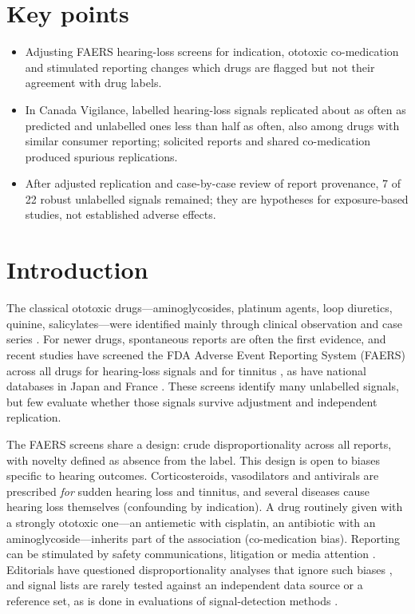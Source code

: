 \documentclass[11pt]{article}
\begin{document}
\section*{Key points}
\begin{itemize}
\item Adjusting FAERS hearing-loss screens for indication, ototoxic co-medication and stimulated reporting changes which drugs
are flagged but not their agreement with drug labels.
\item In Canada Vigilance, labelled hearing-loss signals replicated about as often as predicted and unlabelled ones less than half
as often, also among drugs with similar consumer reporting; solicited reports and shared co-medication produced spurious
replications.
\item After adjusted replication and case-by-case review of report provenance, 7 of 22 robust unlabelled signals
remained; they are hypotheses for exposure-based studies, not established adverse effects.
\end{itemize}

\section{Introduction}
The classical ototoxic drugs---aminoglycosides, platinum agents, loop diuretics, quinine, salicylates---were identified
mainly through clinical observation and case series \cite{lanvers2017}. For newer drugs, spontaneous reports are often the
first evidence, and recent studies have screened the FDA Adverse Event Reporting System (FAERS) across all drugs for
hearing-loss signals \cite{li2024,wu2025,liu2025} and for tinnitus \cite{narasimhaswamy2026,wang2024}, as have national
databases in Japan and France \cite{tanaka2019,favreliere2020}. These screens identify many unlabelled signals, but few
evaluate whether those signals survive adjustment and independent replication.

The FAERS screens share a design: crude disproportionality across all reports, with novelty defined as absence from the
label. This design is open to biases specific to hearing outcomes. Corticosteroids, vasodilators and antivirals are
prescribed \emph{for} sudden hearing loss and tinnitus, and several diseases cause hearing loss themselves (confounding by
indication). A drug routinely given with a strongly ototoxic one---an antiemetic with cisplatin, an antibiotic with an
aminoglycoside---inherits part of the association (co-medication bias). Reporting can be stimulated by safety
communications, litigation or media attention \cite{pariente2007}. Editorials have questioned disproportionality analyses
that ignore such biases \cite{ramessur2025}, and signal lists are rarely tested against an independent data source or a
reference set, as is done in evaluations of signal-detection methods \cite{harpaz2013}.
\end{document}

